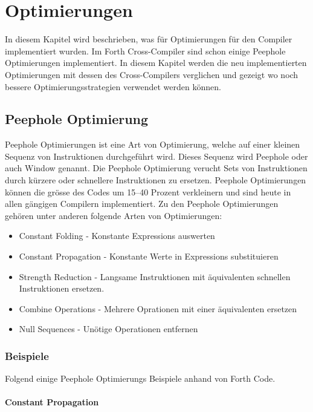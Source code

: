 \chapter{Optimierungen}

In diesem Kapitel wird beschrieben, was für Optimierungen für den Compiler implementiert wurden. Im Forth Cross-Compiler sind schon einige Peephole Optimierungen implementiert. In diesem Kapitel werden die neu implementierten Optimierungen mit dessen des Cross-Compilers verglichen und gezeigt wo noch bessere Optimierungsstrategien verwendet werden können.

\section{Peephole Optimierung}

Peephole Optimierungen ist eine Art von Optimierung, welche auf einer kleinen Sequenz von Instruktionen durchgeführt wird. Dieses Sequenz wird Peephole oder auch Window genannt. Die Peephole Optimierung verucht Sets von Instruktionen durch kürzere oder schnellere Instruktionen zu ersetzen.\cite{peepwiki} Peephole Optimierungen können die grösse des Codes um 15--40 Prozent verkleinern und sind heute in allen gängigen Compilern implementiert.\cite{peepdavidson} Zu den Peephole Optimierungen gehören unter anderen folgende Arten von Optimierungen:

\begin{itemize} 
	\item Constant Folding - Konstante Expressions auswerten
	\item Constant Propagation - Konstante Werte in Expressions substituieren
	\item Strength Reduction - Langsame Instruktionen mit äquivalenten schnellen Instruktionen ersetzen.
	\item Combine Operations - Mehrere Oprationen mit einer äquivalenten ersetzen
	\item Null Sequences - Unötige Operationen entfernen\cite{peepwiki}
\end{itemize}

\newpage

\subsection{Beispiele}

Folgend einige Peephole Optimierungs Beispiele anhand von Forth Code.

\subsubsection{Constant Propagation}
\label{constantprogationsection}

